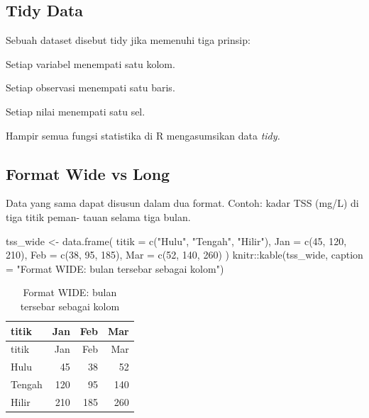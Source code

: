 \documentclass[
  indonesian,
  letterpaper,
]{book}
\newenvironment{Shaded}{\begin{snugshade}}{\end{snugshade}}
\newcommand{\AttributeTok}[1]{\textcolor[rgb]{0.40,0.45,0.13}{#1}}
\newcommand{\DecValTok}[1]{\textcolor[rgb]{0.68,0.00,0.00}{#1}}
\newcommand{\FunctionTok}[1]{\textcolor[rgb]{0.28,0.35,0.67}{#1}}
\newcommand{\NormalTok}[1]{\textcolor[rgb]{0.00,0.23,0.31}{#1}}
\newcommand{\OtherTok}[1]{\textcolor[rgb]{0.00,0.23,0.31}{#1}}
\newcommand{\SpecialCharTok}[1]{\textcolor[rgb]{0.37,0.37,0.37}{#1}}
\newcommand{\StringTok}[1]{\textcolor[rgb]{0.13,0.47,0.30}{#1}}
\begin{document}
\subsection{Tidy Data}\label{tidy-data}

Sebuah dataset disebut tidy jika memenuhi tiga prinsip:

Setiap variabel menempati satu kolom.

Setiap observasi menempati satu baris.

Setiap nilai menempati satu sel.

Hampir semua fungsi statistika di R mengasumsikan data \emph{tidy.}

\subsection{Format Wide vs Long}\label{format-wide-vs-long}

Data yang sama dapat disusun dalam dua format. Contoh: kadar TSS (mg/L)
di tiga titik peman- tauan selama tiga bulan.

\begin{Shaded}
\begin{Highlighting}[]
\NormalTok{tss\_wide }\OtherTok{\textless{}{-}} \FunctionTok{data.frame}\NormalTok{(}
\AttributeTok{titik =} \FunctionTok{c}\NormalTok{(}\StringTok{"Hulu"}\NormalTok{, }\StringTok{"Tengah"}\NormalTok{, }\StringTok{"Hilir"}\NormalTok{),}
\AttributeTok{Jan =} \FunctionTok{c}\NormalTok{(}\DecValTok{45}\NormalTok{, }\DecValTok{120}\NormalTok{, }\DecValTok{210}\NormalTok{),}
\AttributeTok{Feb =} \FunctionTok{c}\NormalTok{(}\DecValTok{38}\NormalTok{, }\DecValTok{95}\NormalTok{, }\DecValTok{185}\NormalTok{),}
\AttributeTok{Mar =} \FunctionTok{c}\NormalTok{(}\DecValTok{52}\NormalTok{, }\DecValTok{140}\NormalTok{, }\DecValTok{260}\NormalTok{)}
\NormalTok{)}
\NormalTok{knitr}\SpecialCharTok{::}\FunctionTok{kable}\NormalTok{(tss\_wide, }\AttributeTok{caption =} \StringTok{"Format WIDE: bulan tersebar sebagai kolom"}\NormalTok{)}
\end{Highlighting}
\end{Shaded}

\begin{longtable}[]{@{}lrrr@{}}
\caption{Format WIDE: bulan tersebar sebagai kolom}\tabularnewline
\toprule\noalign{}
titik & Jan & Feb & Mar \\
\midrule\noalign{}
\endfirsthead
\toprule\noalign{}
titik & Jan & Feb & Mar \\
\midrule\noalign{}
\endhead
\bottomrule\noalign{}
\endlastfoot
Hulu & 45 & 38 & 52 \\
Tengah & 120 & 95 & 140 \\
Hilir & 210 & 185 & 260 \\
\end{longtable}
\end{document}
